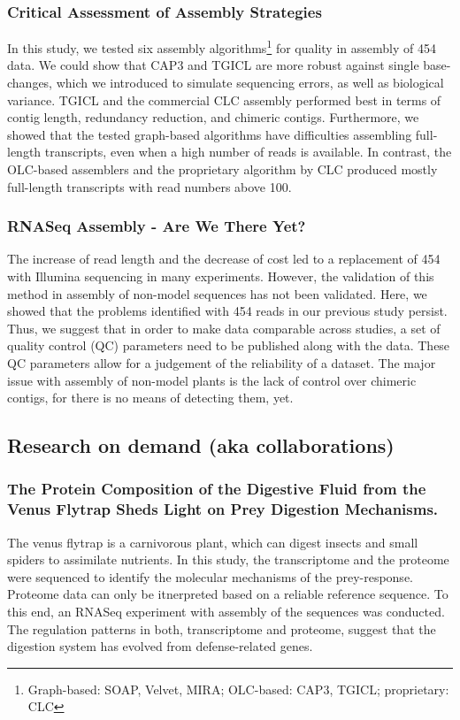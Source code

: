 \subsubsection{Critical Assessment of Assembly Strategies
\cite{mp_Braeutigam2011}}

In this study, we tested six assembly algorithms\footnote{Graph-based: SOAP, Velvet, MIRA; OLC-based: CAP3, TGICL; proprietary: CLC} for quality in  assembly of 454 data. We could show that CAP3 and TGICL are more robust against single base-changes, which we introduced to simulate sequencing errors, as well as biological variance. TGICL and the commercial CLC  assembly performed best in terms of contig length, redundancy reduction, and chimeric contigs.
Furthermore, we showed that the tested graph-based algorithms have difficulties assembling full-length transcripts, even when a high number of reads is available. In contrast, the OLC-based assemblers and the proprietary algorithm by CLC produced mostly full-length transcripts with read numbers above 100.

\subsubsection{RNASeq Assembly - Are We There Yet?
\cite{mp_Schliesky2012}}

The increase of read length and the decrease of cost led to a replacement of 454 with Illumina sequencing in many experiments. However, the validation of this method in  assembly of non-model sequences has not been validated. Here, we showed that the problems identified with 454 reads in our previous study \cite{mp_Braeutigam2011} persist. Thus, we suggest that in order to make data comparable across studies, a set of quality control (QC) parameters need to be published along with the data. These QC parameters allow for a judgement of the reliability of a dataset.
The major issue with  assembly of non-model plants is the lack of control over chimeric contigs, for there is no means of detecting them, yet.

\subsection{Research on demand (aka collaborations)}
\subsubsection{The Protein Composition of the Digestive Fluid
from the Venus Flytrap Sheds Light on Prey
Digestion Mechanisms. \cite{mp_Schulze2012}}
The venus flytrap is a carnivorous plant, which can digest insects and small spiders to assimilate nutrients.
In this study, the transcriptome and the proteome were sequenced to identify the molecular mechanisms of the prey-response.
Proteome data can only be itnerpreted based on a reliable reference sequence.
To this end, an RNASeq experiment with  assembly of the sequences was conducted.
The regulation patterns in both, transcriptome and proteome, suggest that the digestion system has evolved from defense-related genes.

